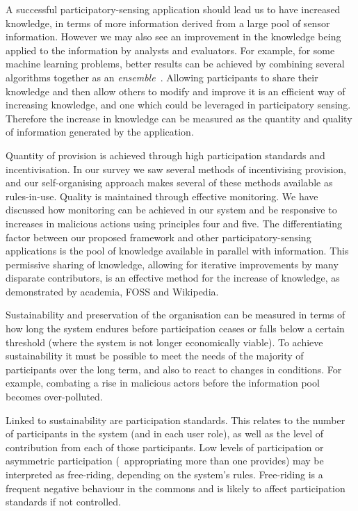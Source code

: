 A successful participatory-sensing application should lead us to have increased knowledge, in terms of more information derived from a large pool of sensor information. 
However we may also see an improvement in the knowledge being applied to the information by analysts and evaluators.
For example, for some machine learning problems, better results can be achieved by combining several algorithms together as an \emph{ensemble}~\citep{Opitz1999}.
Allowing participants to share their knowledge and then allow others to modify and improve it is an efficient way of increasing knowledge, and one which could be leveraged in participatory sensing. Therefore the increase in knowledge can be measured as the quantity and quality of information generated by the application.

Quantity of provision is achieved through high participation standards and incentivisation. 
In our survey we saw several methods of incentivising provision, and our self-organising approach makes several of these methods available as rules-in-use. 
Quality is maintained through effective monitoring. 
We have discussed how monitoring can be achieved in our system and be responsive to increases in malicious actions using principles four and five. 
The differentiating factor between our proposed framework and other participatory-sensing applications is the pool of knowledge available in parallel with information. This permissive sharing of knowledge, allowing for iterative improvements by many disparate contributors, is an effective method for the increase of knowledge, as demonstrated by academia, \ac{FOSS} and Wikipedia.

Sustainability and preservation of the organisation can be measured in terms of how long the system endures before participation ceases or falls below a certain threshold (where the system is not longer economically viable). 
To achieve sustainability it must be possible to meet the needs of the majority of participants over the long term, and also to react to changes in conditions. 
For example, combating a rise in malicious actors before the information pool becomes over-polluted. 

Linked to sustainability are participation standards. 
This relates to the number of participants in the system (and in each user role), as well as the level of contribution from each of those participants. Low levels of participation or asymmetric participation (\eg\ appropriating more than one provides) may be interpreted as free-riding, depending on the system's rules. 
Free-riding is a frequent negative behaviour in the commons and is likely to affect participation standards if not controlled.

